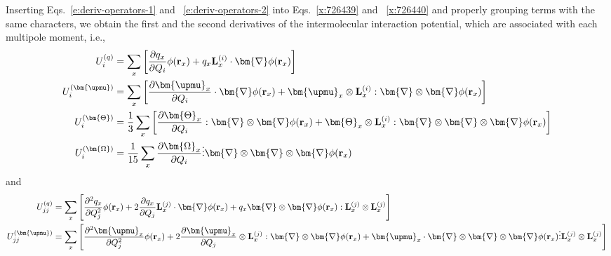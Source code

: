 \documentclass[a4paper,titlepage,twoside,fleqn,12pt]{book}
\newcommand{\BM}[1]{\bm{#1}}
\newcommand{\fderiv}[2]{\ensuremath{
    \frac{\partial #1}{\partial #2}}}
\newcommand{\sderiv}[2]{\ensuremath{
    \frac{\partial^2 #1}{\partial #2^2}
    }}
\begin{document}
\begin{refsection}
Inserting Eqs.~\eqref{e:deriv-operators-1} and ~\eqref{e:deriv-operators-2}
into Eqs.~\eqref{x:726439} and ~\eqref{x:726440} and properly 
grouping terms with the same characters, we obtain
the first and the second derivatives of the intermolecular interaction
potential, which are associated with each multipole moment, i.e.,
%
\begin{subequations}  \label{e:f-terms}
\begin{align}
 U_i^{(q)}          &= \sum_x 
  \left[ \fderiv{q_x}{Q_i} \phi({\bf r}_x) 
 + q_x {\bf L}_x^{(i)} \cdot {\BM \nabla} \phi({\bf r}_x) \right]       
                                                                \label{e:f-terms-1} \\
 U_i^{(\BM\upmu)}     &= \sum_x  
  \left[ \fderiv{{\BM \upmu}_x}{Q_i} \cdot {\BM \nabla}\phi({\bf r}_x) 
 + {\BM \upmu}_x \otimes {\bf L}_x^{(i)} : {\BM \nabla}\otimes{\BM \nabla} \phi({\bf r}_x) \right]     
                                                                \label{e:f-terms-2} \\
 U_i^{(\BM\Theta)}  &= \frac{1}{3} \sum_x  
  \left[ \fderiv{{\BM \Theta}_x}{Q_i} : {\BM \nabla}\otimes{\BM \nabla}\phi({\bf r}_x) 
 + {\BM \Theta}_x \otimes {\bf L}_x^{(i)} : {\BM \nabla}\otimes{\BM \nabla}\otimes{\BM \nabla} \phi({\bf r}_x) \right]      
                                                                \label{e:f-terms-3} \\
 U_i^{(\BM\Omega)}  &= \frac{1}{15} \sum_x      
  \fderiv{{\BM \Omega}_x}{Q_i} \vdots {\BM \nabla}\otimes{\BM \nabla}\otimes{\BM \nabla}\phi({\bf r}_x)  
                                                                \label{e:f-terms-4} 
\end{align}
\end{subequations}
%
and
%
\begin{subequations}  \label{e:k-terms}
\begin{align}
 U_{jj}^{(q)}          &= \sum_x   
    \left[ \sderiv{q_x}{Q_j} \phi({\bf r}_x) 
    + 2 \fderiv{q_x}{Q_j} {\bf L}_x^{(j)} \cdot {\BM \nabla} \phi({\bf r}_x) 
    + q_x {\BM \nabla}\otimes{\BM \nabla} \phi({\bf r}_x) : {\bf L}_x^{(j)} \otimes {\bf L}_x^{(j)} \right]     \label{e:k-terms-1} \\
%
 U_{jj}^{(\BM\upmu)}     &= \sum_x  
    \left[ \sderiv{{\BM \upmu}_x}{Q_j} \phi({\bf r}_x) 
    + 2 \fderiv{{\BM \upmu}_x}{Q_j} \otimes {\bf L}_x^{(j)} : {\BM \nabla}\otimes{\BM \nabla} \phi({\bf r}_x) 
    + {\BM \upmu}_x 
    \cdot {\BM \nabla}\otimes{\BM \nabla}\otimes{\BM \nabla} \phi({\bf r}_x) \vdots {\bf L}_x^{(j)} \otimes {\bf L}_x^{(j)} \right]      

\end{align}
\end{subequations}
\end{refsection}
\end{document}
